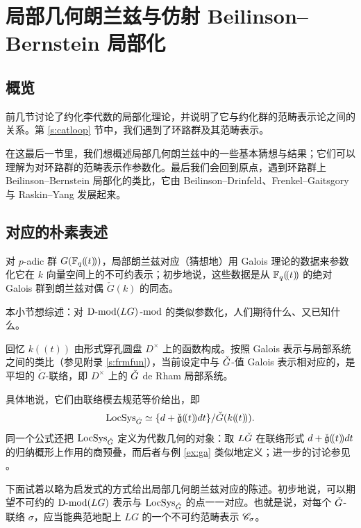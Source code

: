 \section{局部几何朗兰兹与仿射 Beilinson--Bernstein 局部化}

\label{s:affbbloc}

\subsection{概览}

\ssszh 前几节讨论了约化李代数的局部化理论，并说明了它与约化群的范畴表示论之间的关系。第 \ref{s:catloop} 节中，我们遇到了环路群及其范畴表示。

在这最后一节里，我们想概述局部几何朗兰兹中的一些基本猜想与结果；它们可以理解为对环路群的范畴表示作参数化。最后我们会回到原点，遇到环路群上 Beilinson--Bernstein 局部化的类比，它由 Beilinson--Drinfeld、Frenkel--Gaitsgory 与 Raskin--Yang 发展起来。

\subsection{对应的朴素表述}



\ssszh 对 $p$-adic 群 $G(\mathbb{F}_q(\!(t)\!))$，局部朗兰兹对应（猜想地）用 Galois 理论的数据来参数化它在 $k$ 向量空间上的不可约表示；初步地说，这些数据是从 $\mathbb{F}_q(\!(t)\!)$ 的绝对 Galois 群到朗兰兹对偶 $\check{G}(k)$ 的同态。


本小节想综述：对 $\operatorname{D-mod}(LG)\operatorname{-mod}$ 的类似参数化，人们期待什么、又已知什么。



\ssszh 回忆 $k(\!(t)\!)$ 由形式穿孔圆盘 $D^\times$ 上的函数构成。按照 Galois 表示与局部系统之间的类比（参见附录 \ref{s:frmfun}），当前设定中与 $\check{G}$-值 Galois 表示相对应的，是平坦的 $\check{G}$-联络，即 $D^\times$ 上的 $\check{G}$ de Rham 局部系统。

具体地说，它们由联络模去规范等价给出，即
%
\[
    \operatorname{LocSys}_{\check{G}} \simeq \{ d + \check{\mathfrak{g}}(\!(t)\!)dt \} / \check{G}(k(\!(t)\!)).
\]
%
同一个公式还把 $\operatorname{LocSys}_{\check{G}}$ 定义为代数几何的对象：取 $L\check{G}$ 在联络形式 $d + \check{\mathfrak{g}}(\!(t)\!)dt$ 的归纳概形上作用的商预叠，而后者与例 \ref{ex:ga} 类似地定义；进一步的讨论参见 \cite{raskinspectraldecomp}。



\ssszh \label{s:infdiscuss} 下面试着以略为启发式的方式给出局部几何朗兰兹对应的陈述。初步地说，可以期望不可约的 $\operatorname{D-mod}(LG)$ 表示与 $\operatorname{LocSys}_{\check{G}}$ 的点一一对应。也就是说，对每个 $\check{G}$-联络 $\sigma$，应当能典范地配上 $LG$ 的一个不可约范畴表示 $\mathscr{C}_{\sigma}$。

